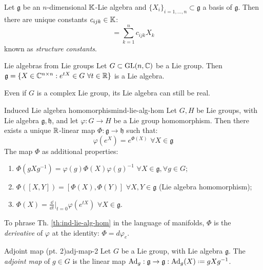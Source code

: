 Let $ \mathfrak{g} $ be an $ n $-dimensional $ \mathbb{K} $-Lie algebra and $ \{X_i\}_{i = 1,\dots,n} \subset \mathfrak{g} $ a basis of $ \mathfrak{g} $. Then there are unique constants $ c_{ijk} \in \mathbb{K} $:
\begin{equation*}
  [X_i , X_j] = \sum_{k = 1}^{n} c_{ijk} X_k
\end{equation*}
known as \textit{structure constants}.

\begin{theorem}{Lie algebras from Lie groups}{}
  Let $ G \subset \mathrm{GL}(n,\mathbb{C}) $ be a Lie group. Then $ \mathfrak{g} = \{X \in \mathbb{C}^{n \times n} : e^{t X} \in G \,\,\forall t \in \mathbb{R} \} $ is a Lie algebra.
\end{theorem}

Even if $ G $ is a complex Lie group, its Lie algebra can still be real.

\begin{theorem}{Induced Lie algebra homomorphism}{ind-lie-alg-hom}
  Let $ G,H $ be Lie groups, with Lie algebra $ \mathfrak{g},\mathfrak{h} $, and let $ \varphi : G \rightarrow H $ be a Lie group homomorphism. Then there exists a unique $ \mathbb{R} $-linear map $ \Phi : \mathfrak{g} \rightarrow \mathfrak{h} $ such that:
  \begin{equation*}
    \varphi(e^X) = e^{\Phi(X)} \,\,\forall X \in \mathfrak{g}
  \end{equation*}
  The map $ \Phi $ as additional properties:
  \begin{enumerate}
    \item $ \Phi(gXg^{-1}) = \varphi(g) \Phi(X) \varphi(g)^{-1} \,\,\forall X \in \mathfrak{g} , \forall g \in G $;
    \item $ \Phi([X,Y]) = [\Phi(X),\Phi(Y)] \,\,\forall X,Y \in \mathfrak{g} $ (Lie algebra homomorphism);
    \item $ \Phi(X) = \frac{\dd}{\dd t}\big\vert_{t = 0} \varphi(e^{tX}) \,\,\forall X \in \mathfrak{g} $.
  \end{enumerate}
\end{theorem}

To phrase Th. \ref{th:ind-lie-alg-hom} in the language of manifolds, $ \Phi $ is the \textit{derivative} of $ \varphi $ at the identity: $ \Phi = d\varphi_e $.

\begin{definition}{Adjoint map (pt. 2)}{adj-map-2}
  Let $ G $ be a Lie group, with Lie algebra $ \mathfrak{g} $. The \textit{adjoint map} of $ g \in G $ is the linear map $ \Ad_g : \mathfrak{g} \rightarrow \mathfrak{g} : \Ad_g(X) \defeq g X g^{-1} $.
\end{definition}

